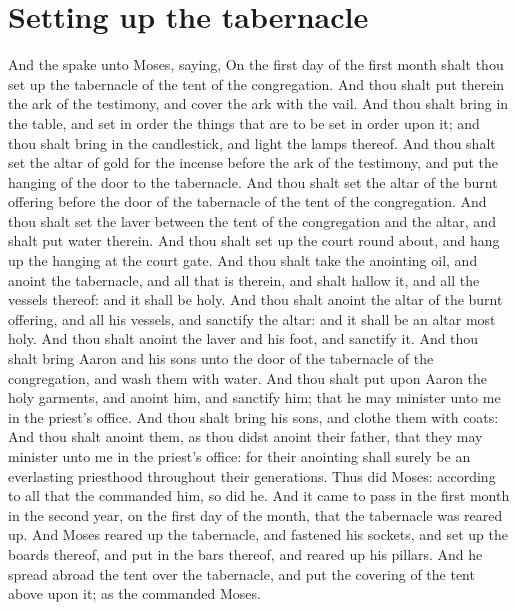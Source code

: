 \section*{Setting up the tabernacle}
\begin{biblechapter} %
\verse And the \LORD spake unto Moses, saying,
\verse On the first day of the first month shalt thou set up the tabernacle of the tent of the congregation.
\verse And thou shalt put therein the ark of the testimony, and cover the ark with the vail.
\verse And thou shalt bring in the table, and set in order the things that are to be set in order upon it; and thou shalt bring in the candlestick, and light the lamps thereof.
\verse And thou shalt set the altar of gold for the incense before the ark of the testimony, and put the hanging of the door to the tabernacle.
\verse And thou shalt set the altar of the burnt offering before the door of the tabernacle of the tent of the congregation.
\verse And thou shalt set the laver between the tent of the congregation and the altar, and shalt put water therein.
\verse And thou shalt set up the court round about, and hang up the hanging at the court gate.
\verse And thou shalt take the anointing oil, and anoint the tabernacle, and all that is therein, and shalt hallow it, and all the vessels thereof: and it shall be holy.
\verse And thou shalt anoint the altar of the burnt offering, and all his vessels, and sanctify the altar: and it shall be an altar most holy.
\verse And thou shalt anoint the laver and his foot, and sanctify it.
\verse And thou shalt bring Aaron and his sons unto the door of the tabernacle of the congregation, and wash them with water.
\verse And thou shalt put upon Aaron the holy garments, and anoint him, and sanctify him; that he may minister unto me in the priest's office.
\verse And thou shalt bring his sons, and clothe them with coats:
\verse And thou shalt anoint them, as thou didst anoint their father, that they may minister unto me in the priest's office: for their anointing shall surely be an everlasting priesthood throughout their generations.
\verse Thus did Moses: according to all that the \LORD commanded him, so did he.
\verse And it came to pass in the first month in the second year, on the first day of the month, that the tabernacle was reared up.
\verse And Moses reared up the tabernacle, and fastened his sockets, and set up the boards thereof, and put in the bars thereof, and reared up his pillars.
\verse And he spread abroad the tent over the tabernacle, and put the covering of the tent above upon it; as the \LORD commanded Moses.

\end{biblechapter}

